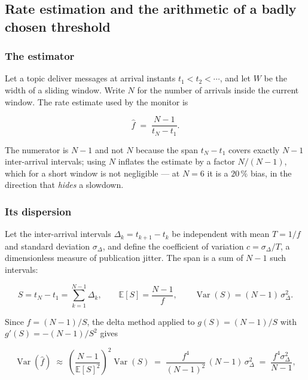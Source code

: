 \subsection{Rate estimation and the arithmetic of a badly chosen threshold}
\label{ssec:camp:cadence}

\subsubsection{The estimator}

Let a topic deliver messages at arrival instants $t_1 < t_2 < \cdots$, and let
$W$ be the width of a sliding window. Write $N$ for the number of arrivals
inside the current window. The rate estimate used by the monitor is

\begin{equation}
  \hat{f} \;=\; \frac{N-1}{t_N - t_1}.
  \label{eq:camp:fhat}
\end{equation}

The numerator is $N-1$ and not $N$ because the span $t_N - t_1$ covers exactly
$N-1$ inter-arrival intervals; using $N$ inflates the estimate by a factor
$N/(N-1)$, which for a short window is not negligible --- at $N=6$ it is a
$20\,\%$ bias, in the direction that \emph{hides} a slowdown.

\subsubsection{Its dispersion}

Let the inter-arrival intervals $\Delta_k = t_{k+1}-t_k$ be independent with
mean $T = 1/f$ and standard deviation $\sigma_\Delta$, and define the
coefficient of variation $c = \sigma_\Delta / T$, a dimensionless measure of
publication jitter. The span is a sum of $N-1$ such intervals:

\begin{equation}
  S = t_N - t_1 = \sum_{k=1}^{N-1}\Delta_k,
  \qquad
  \mathbb{E}[S] = \frac{N-1}{f},
  \qquad
  \operatorname{Var}(S) = (N-1)\,\sigma_\Delta^2 .
\end{equation}

Since $\hat f = (N-1)/S$, the delta method applied to $g(S)=(N-1)/S$ with
$g'(S) = -(N-1)/S^2$ gives

\begin{equation}
  \operatorname{Var}(\hat f)
  \;\approx\; \left(\frac{N-1}{\mathbb{E}[S]^2}\right)^{\!2}\operatorname{Var}(S)
  \;=\; \frac{f^4}{(N-1)^2}\,(N-1)\,\sigma_\Delta^2
  \;=\; \frac{f^4 \sigma_\Delta^2}{N-1},
\end{equation}

